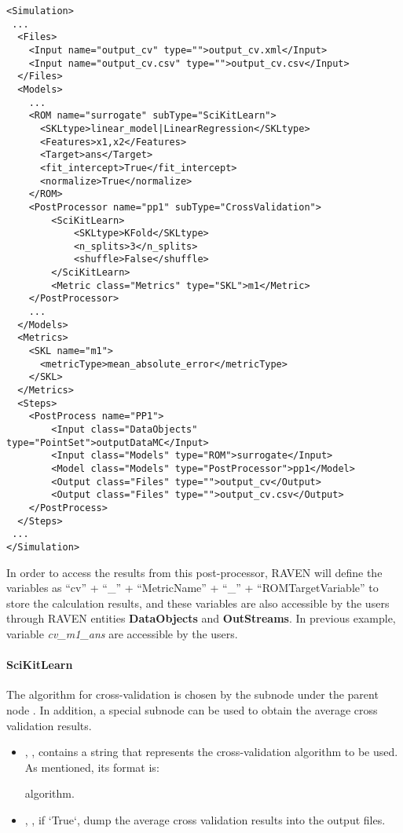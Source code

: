 \begin{lstlisting}[style=XML]
<Simulation>
 ...
  <Files>
    <Input name="output_cv" type="">output_cv.xml</Input>
    <Input name="output_cv.csv" type="">output_cv.csv</Input>
  </Files>
  <Models>
    ...
    <ROM name="surrogate" subType="SciKitLearn">
      <SKLtype>linear_model|LinearRegression</SKLtype>
      <Features>x1,x2</Features>
      <Target>ans</Target>
      <fit_intercept>True</fit_intercept>
      <normalize>True</normalize>
    </ROM>
    <PostProcessor name="pp1" subType="CrossValidation">
        <SciKitLearn>
            <SKLtype>KFold</SKLtype>
            <n_splits>3</n_splits>
            <shuffle>False</shuffle>
        </SciKitLearn>
        <Metric class="Metrics" type="SKL">m1</Metric>
    </PostProcessor>
    ...
  </Models>
  <Metrics>
    <SKL name="m1">
      <metricType>mean_absolute_error</metricType>
    </SKL>
  </Metrics>
  <Steps>
    <PostProcess name="PP1">
        <Input class="DataObjects" type="PointSet">outputDataMC</Input>
        <Input class="Models" type="ROM">surrogate</Input>
        <Model class="Models" type="PostProcessor">pp1</Model>
        <Output class="Files" type="">output_cv</Output>
        <Output class="Files" type="">output_cv.csv</Output>
    </PostProcess>
  </Steps>
 ...
</Simulation>
\end{lstlisting}

In order to access the results from this post-processor, RAVEN will define the variables as ``cv'' +
``\_'' + ``MetricName'' + ``\_'' + ``ROMTargetVariable'' to store the calculation results, and these
variables are also accessible by the users through RAVEN entities \textbf{DataObjects} and \textbf{OutStreams}.
In previous example, variable \textit{cv\_m1\_ans} are accessible by the users.

\paragraph{SciKitLearn}

The algorithm for cross-validation is chosen by the subnode  under the parent node .
In addition, a special subnode  can be used to obtain the average cross validation results.

\begin{itemize}
  \item {}, , contains a string that
    represents the cross-validation algorithm to be used. As mentioned, its format is:

    algorithm.
  \item {}, , if `True`, dump the average cross validation results into the
    output files.
\end{itemize}


